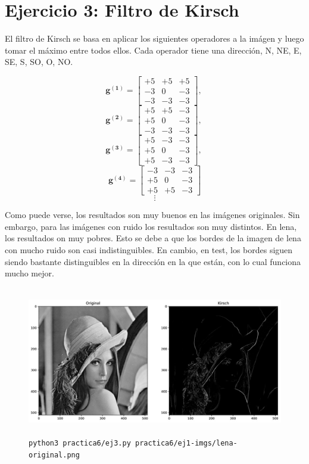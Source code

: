 \documentclass[11pt, spanish]{article}
\begin{document}
\newpage
\section{Ejercicio 3: Filtro de Kirsch}

El filtro de Kirsch se basa en aplicar los siguientes operadores a la imágen y luego tomar el máximo entre todos ellos. Cada operador tiene una dirección, N, NE, E, SE, S, SO, O, NO. 

\[
\mathbf{g^{(1)}} = \begin{bmatrix} 
+5 & +5 & +5 \\
-3 &  0 & -3 \\
-3 & -3 & -3 
\end{bmatrix},\
\]
\[
\mathbf{g^{(2)}} = \begin{bmatrix} 
+5 & +5 & -3 \\
+5 &  0 & -3 \\
-3 & -3 & -3 
\end{bmatrix},\ 
\]
\[
\mathbf{g^{(3)}} = \begin{bmatrix} 
+5 & -3 & -3 \\
+5 &  0 & -3 \\
+5 & -3 & -3 
\end{bmatrix},\ 
\]
\[
\mathbf{g^{(4)}} = \begin{bmatrix} 
-3 & -3 & -3 \\
+5 &  0 & -3 \\
+5 & +5 & -3 
\end{bmatrix}
\]
\[
\vdots
\]

Como puede verse, los resultados son muy buenos en las imágenes originales. Sin embargo, para las imágenes con ruido los resultados son muy distintos. En lena, los resultados on muy pobres. Esto se debe a que los bordes de la imagen de lena con mucho ruido son casi indistinguibles. En cambio, en test, los bordes siguen siendo bastante distinguibles en la dirección en la que están, con lo cual funciona mucho mejor.

\begin{figure}[H]
\centering
    \includegraphics[height=6.5cm]{informe-imgs/ej3--lena-original.jpg}
    \caption{\texttt{python3 practica6/ej3.py practica6/ej1-imgs/lena-original.png }}
\end{figure}
\end{document}
